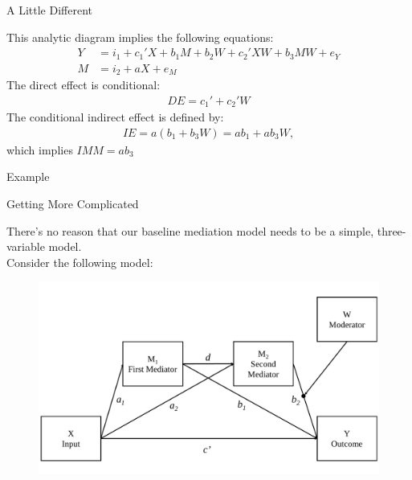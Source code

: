 \documentclass{beamer}
\newcommand{\va}[0]{\vspace{12pt}}
\begin{document}
\begin{frame}{A Little Different}
  
  This analytic diagram implies the following equations:
  \begin{align}
    Y &= i_1 + c_1'X + b_1M + b_2W + c_2'XW + b_3MW + e_Y \label{eq3}\\
    M &= i_2 + aX + e_M
  \end{align}
  The direct effect is conditional:
  \begin{align*}
    DE = c_1' + c_2'W
  \end{align*}
  The conditional indirect effect is defined by:
  \begin{align*}
    IE = a \left(b_1 + b_3W \right) = ab_1 + ab_3W,
  \end{align*}
  which implies $IMM = ab_3$
  
\end{frame}



\begin{frame}[allowframebreaks]{Example}
  


\pagebreak



\end{frame}



\begin{frame}{Getting More Complicated}
  
  There's no reason that our baseline mediation model needs to be a
  simple, three-variable model.\\ 
  \va 
  Consider the following model:
  \begin{figure}
    \includegraphics[width = \textwidth]{figures/serialMediatorModB2withWConceptual.pdf}
  \end{figure}
  
\end{frame}
\end{document}
